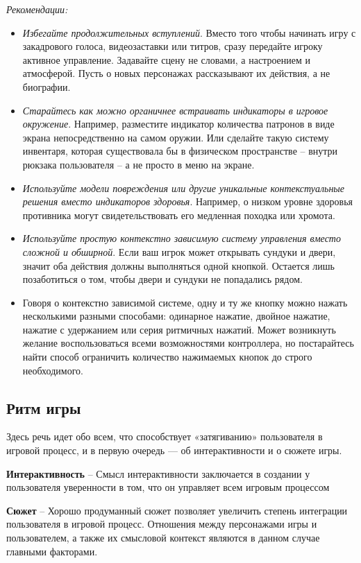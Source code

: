 \documentclass{article}
\begin{document}
\noindent\textit{Рекомендации:}
\begin{itemize}
  \item \textit{Избегайте продолжительных вступлений}. Вместо того чтобы начинать игру с закадрового голоса, видеозаставки или титров, сразу передайте игроку активное управление. Задавайте сцену не словами, а настроением и атмосферой. Пусть о новых персонажах рассказывают их действия, а не биографии.
  \item \textit{Старайтесь как можно органичнее встраивать индикаторы в игровое окружение}. Например, разместите индикатор количества патронов в виде экрана непосредственно на самом оружии. Или сделайте такую систему инвентаря, которая существовала бы в физическом пространстве -- внутри рюкзака пользователя -- а не просто в меню на экране.
  \item \textit{Используйте модели повреждения или другие уникальные контекстуальные решения вместо индикаторов здоровья}. Например, о низком уровне здоровья противника могут свидетельствовать его медленная походка или хромота.
  \item \textit{Используйте простую контекстно зависимую систему управления вместо сложной и обширной}. Если ваш игрок может открывать сундуки и двери, значит оба действия должны выполняться одной кнопкой. Остается лишь позаботиться о том, чтобы двери и сундуки не попадались рядом.
  \item Говоря о контекстно зависимой системе, одну и ту же кнопку можно нажать несколькими разными способами: одинарное нажатие, двойное нажатие, нажатие с удержанием или серия ритмичных нажатий. Может возникнуть желание воспользоваться всеми возможностями контроллера, но постарайтесь найти способ ограничить количество нажимаемых кнопок до строго необходимого.
\end{itemize}

\subsection{Ритм игры}
Здесь речь идет обо всем, что способствует «затягиванию» пользователя в игровой процесс, и в первую очередь — об интерактивности и о сюжете игры.

\textbf{Интерактивность} -- Смысл интерактивности заключается в создании у пользователя уверенности в том, что он управляет всем игровым процессом

\textbf{Сюжет} -- Хорошо продуманный сюжет позволяет увеличить степень интеграции пользователя в игровой процесс. Отношения между персонажами игры и пользователем, а также их смысловой контекст являются в данном случае главными факторами.
\end{document}
